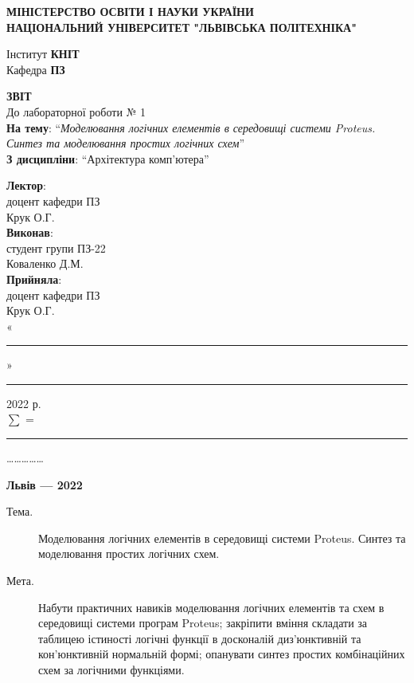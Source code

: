 \documentclass{article}
\newcommand\subject{Архітектура комп'ютера}
\newcommand\lecturer{доцент кафедри ПЗ\\Крук О.Г.}
\newcommand\teacher{доцент кафедри ПЗ\\Крук О.Г.}
\newcommand\mygroup{ПЗ-22}
\newcommand\lab{1}
\newcommand\theme{Моделювання логічних елементів в середовищі системи Proteus. Синтез та моделювання простих логічних схем}
\newcommand\purpose{Набути практичних навиків моделювання логічних елементів та схем в середовищі системи програм Proteus; закріпити вміння складати за таблицею істиності логічні функції в досконалій диз'юнктивній та кон'юнктивній нормальній формі; опанувати синтез простих комбінаційних схем за логічними функціями}
\begin{document}
\begin{normalsize}
	\begin{titlepage}
		\thispagestyle{empty}
		\begin{center}
			\textbf{МІНІСТЕРСТВО ОСВІТИ І НАУКИ УКРАЇНИ\\
				НАЦІОНАЛЬНИЙ УНІВЕРСИТЕТ "ЛЬВІВСЬКА ПОЛІТЕХНІКА"}
		\end{center}
		\begin{flushright}
			Інститут \textbf{КНІТ}\\
			Кафедра \textbf{ПЗ}
		\end{flushright}
		\vspace{200pt}
		\begin{center}
			\textbf{ЗВІТ}\\
			\vspace{10pt}
			До лабораторної роботи № \lab\\
			\textbf{На тему}: “\textit{\theme}”\\
			\textbf{З дисципліни}: “\subject”
		\end{center}
		\vspace{112pt}
		\begin{flushright}
			
			\textbf{Лектор}:\\
			\lecturer\\
			\vspace{28pt}
			\textbf{Виконав}:\\
			
			студент групи \mygroup\\
			Коваленко Д.М.\\
			\vspace{28pt}
			\textbf{Прийняла}:\\
			
			\teacher\\
			
			\vspace{28pt}
			«\rule{1cm}{0.15mm}» \rule{1.5cm}{0.15mm} 2022 р.\\
			$\sum$ = \rule{1cm}{0.15mm}……………\\
			
		\end{flushright}
		\vspace{\fill}
		\begin{center}
			\textbf{Львів — 2022}
		\end{center}
	\end{titlepage}
		
	\begin{description}
		\item[Тема.] \theme.
		\item[Мета.] \purpose.
	\end{description}


\end{normalsize}
\end{document}
